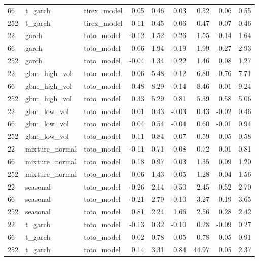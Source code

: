 {\begin{tabular}{lllrrrrrr}
66 & t\_garch & tirex\_model & 0.05 & 0.46 & 0.03 & 0.52 & 0.06 & 0.55 \\
252 & t\_garch & tirex\_model & 0.11 & 0.45 & 0.06 & 0.47 & 0.07 & 0.46 \\
\midrule
22 & garch & toto\_model & -0.12 & 1.52 & -0.26 & 1.55 & -0.14 & 1.64 \\
66 & garch & toto\_model & 0.06 & 1.94 & -0.19 & 1.99 & -0.27 & 2.93 \\
252 & garch & toto\_model & -0.04 & 1.34 & 0.22 & 1.46 & 0.08 & 1.27 \\
\midrule
22 & gbm\_high\_vol & toto\_model & 0.06 & 5.48 & 0.12 & 6.80 & -0.76 & 7.71 \\
66 & gbm\_high\_vol & toto\_model & 0.48 & 8.29 & -0.14 & 8.46 & 0.01 & 9.24 \\
252 & gbm\_high\_vol & toto\_model & 0.33 & 5.29 & 0.81 & 5.39 & 0.58 & 5.06 \\
\midrule
22 & gbm\_low\_vol & toto\_model & 0.01 & 0.43 & -0.03 & 0.43 & -0.02 & 0.46 \\
66 & gbm\_low\_vol & toto\_model & 0.04 & 0.54 & -0.04 & 0.60 & -0.01 & 0.94 \\
252 & gbm\_low\_vol & toto\_model & 0.11 & 0.84 & 0.07 & 0.59 & 0.05 & 0.58 \\
\midrule
22 & mixture\_normal & toto\_model & -0.11 & 0.71 & -0.08 & 0.72 & 0.01 & 0.81 \\
66 & mixture\_normal & toto\_model & 0.18 & 0.97 & 0.03 & 1.35 & 0.09 & 1.20 \\
252 & mixture\_normal & toto\_model & 0.06 & 1.43 & 0.05 & 1.28 & -0.04 & 1.56 \\
\midrule
22 & seasonal & toto\_model & -0.26 & 2.14 & -0.50 & 2.45 & -0.52 & 2.70 \\
66 & seasonal & toto\_model & -0.21 & 2.79 & -0.10 & 3.27 & -0.19 & 3.65 \\
252 & seasonal & toto\_model & 0.81 & 2.24 & 1.66 & 2.56 & 0.28 & 2.42 \\
\midrule
22 & t\_garch & toto\_model & -0.13 & 0.32 & -0.10 & 0.28 & -0.09 & 0.27 \\
66 & t\_garch & toto\_model & 0.02 & 0.78 & 0.05 & 0.78 & 0.05 & 0.91 \\
252 & t\_garch & toto\_model & 0.14 & 3.31 & 0.84 & 44.97 & 0.05 & 2.37 \\
\bottomrule
\end{tabular}
}